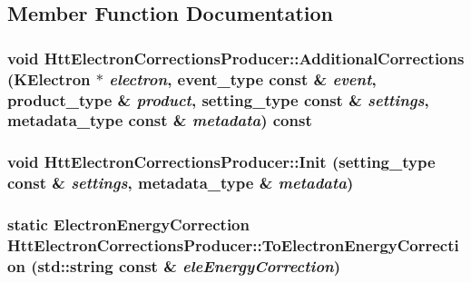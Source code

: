 \subsection{Member Function Documentation}
\hypertarget{classHttElectronCorrectionsProducer_a9de2dd4eaa7676e68e9c67ff9616a9f2}{
\subsubsection[{AdditionalCorrections}]{\setlength{\rightskip}{0pt plus 5cm}void HttElectronCorrectionsProducer::AdditionalCorrections (KElectron $\ast$ {\em electron}, \/  {\bf event\_\-type} const \& {\em event}, \/  {\bf product\_\-type} \& {\em product}, \/  {\bf setting\_\-type} const \& {\em settings}, \/  {\bf metadata\_\-type} const \& {\em metadata}) const}}
\label{classHttElectronCorrectionsProducer_a9de2dd4eaa7676e68e9c67ff9616a9f2}
\hypertarget{classHttElectronCorrectionsProducer_a23e30f4e831c2be5cef1c9968fee70e0}{
\subsubsection[{Init}]{\setlength{\rightskip}{0pt plus 5cm}void HttElectronCorrectionsProducer::Init ({\bf setting\_\-type} const \& {\em settings}, \/  {\bf metadata\_\-type} \& {\em metadata})}}
\label{classHttElectronCorrectionsProducer_a23e30f4e831c2be5cef1c9968fee70e0}
\hypertarget{classHttElectronCorrectionsProducer_a29ad3cf007efb99ee413fccdfb1896a6}{
\subsubsection[{ToElectronEnergyCorrection}]{\setlength{\rightskip}{0pt plus 5cm}static {\bf ElectronEnergyCorrection} HttElectronCorrectionsProducer::ToElectronEnergyCorrection (std::string const \& {\em eleEnergyCorrection})}}
\label{classHttElectronCorrectionsProducer_a29ad3cf007efb99ee413fccdfb1896a6}


